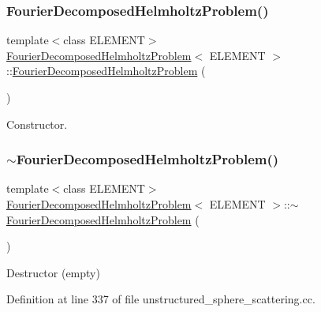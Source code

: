 \subsubsection{\texorpdfstring{Fourier\+Decomposed\+Helmholtz\+Problem()}{FourierDecomposedHelmholtzProblem()}\hspace{0.1cm}{\footnotesize\ttfamily [2/2]}}
{\footnotesize\ttfamily template$<$class E\+L\+E\+M\+E\+NT$>$ \\
\hyperlink{classFourierDecomposedHelmholtzProblem}{Fourier\+Decomposed\+Helmholtz\+Problem}$<$ E\+L\+E\+M\+E\+NT $>$\+::\hyperlink{classFourierDecomposedHelmholtzProblem}{Fourier\+Decomposed\+Helmholtz\+Problem} (\begin{DoxyParamCaption}{ }\end{DoxyParamCaption})}



Constructor. 

\mbox{\label{classFourierDecomposedHelmholtzProblem_a03174fa5a35b7c38f08f91bcd2a80c20}} 
\subsubsection{\texorpdfstring{$\sim$\+Fourier\+Decomposed\+Helmholtz\+Problem()}{~FourierDecomposedHelmholtzProblem()}\hspace{0.1cm}{\footnotesize\ttfamily [2/2]}}
{\footnotesize\ttfamily template$<$class E\+L\+E\+M\+E\+NT$>$ \\
\hyperlink{classFourierDecomposedHelmholtzProblem}{Fourier\+Decomposed\+Helmholtz\+Problem}$<$ E\+L\+E\+M\+E\+NT $>$\+::$\sim$\hyperlink{classFourierDecomposedHelmholtzProblem}{Fourier\+Decomposed\+Helmholtz\+Problem} (\begin{DoxyParamCaption}{ }\end{DoxyParamCaption})\hspace{0.3cm}{\ttfamily [inline]}}



Destructor (empty) 



Definition at line 337 of file unstructured\+\_\+sphere\+\_\+scattering.\+cc.



